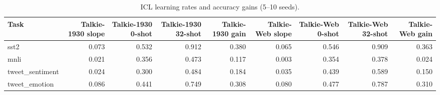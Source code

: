 \begin{table}
\caption{ICL learning rates and accuracy gains (5--10 seeds).}
\label{tab:icl_slopes}
\begin{tabular}{lrrrrrrrr}
\toprule
Task & Talkie-1930 slope & Talkie-1930 0-shot & Talkie-1930 32-shot & Talkie-1930 gain & Talkie-Web slope & Talkie-Web 0-shot & Talkie-Web 32-shot & Talkie-Web gain \\
\midrule
sst2 & 0.073 & 0.532 & 0.912 & 0.380 & 0.065 & 0.546 & 0.909 & 0.363 \\
mnli & 0.021 & 0.356 & 0.473 & 0.117 & 0.003 & 0.354 & 0.378 & 0.024 \\
tweet\_sentiment & 0.024 & 0.300 & 0.484 & 0.184 & 0.035 & 0.439 & 0.589 & 0.150 \\
tweet\_emotion & 0.086 & 0.441 & 0.749 & 0.308 & 0.080 & 0.477 & 0.787 & 0.310 \\
\bottomrule
\end{tabular}
\end{table}

